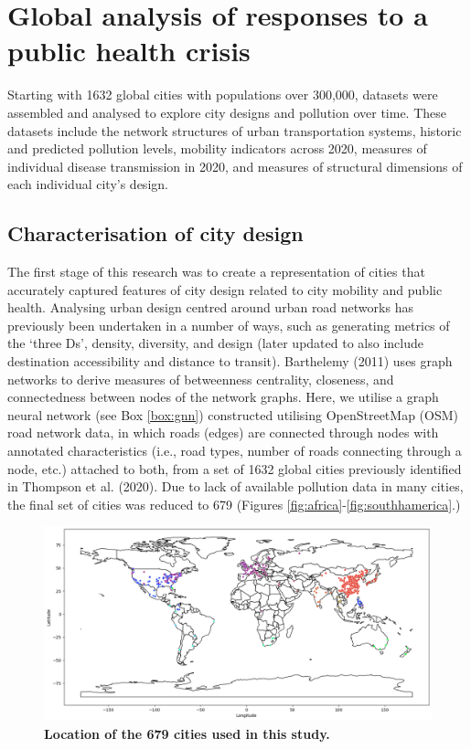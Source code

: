 \documentclass[preprint,10pt]{elsarticle} %
\begin{document}
\section*{\textcolor{OliveGreen}{Global analysis of responses to a public health crisis}}

Starting with 1632 global cities with populations over 300,000\cite{UNDESA2019}, datasets were assembled and analysed to explore city designs and pollution over time. These datasets include the network structures of urban transportation systems, historic and predicted pollution levels, mobility indicators across 2020, measures of individual disease transmission in 2020, and measures of structural dimensions of each individual city's design.

\subsection*{Characterisation of city design}
The first stage of this research was to create a representation of cities that accurately captured features of city design related to city mobility and public health. Analysing urban design centred around urban road networks has previously been undertaken in a number of ways, such as generating metrics of the `three Ds'\cite{Ewing2010}, density, diversity, and design (later updated to also include destination accessibility and distance to transit). Barthelemy (2011)\cite{Barthelemy2011} uses graph networks to derive measures of betweenness centrality, closeness, and connectedness between nodes of the network graphs. Here, we utilise a graph neural network (see Box \ref{box:gnn}) constructed utilising OpenStreetMap (OSM) road network data\cite{Boeing2017a}, in which roads (edges) are connected through nodes with annotated characteristics (i.e., road types, number of roads connecting through a node, etc.) attached to both, from a set of 1632 global cities previously identified in Thompson et al. (2020)\cite{Thompson2020}. Due to lack of available pollution data in many cities, the final set of cities was reduced to 679 (Figures \ref{fig:africa}-\ref{fig:southhamerica}.) 


\begin{figure}
\centering
\includegraphics[trim={0 0 0 0},clip,scale=0.4]{Images/ByCountry_map_Zeigler.png}
\caption{\bf Location of the 679 cities used in this study.}
 \label{fig:clusters}
\end{figure}
\end{document}
